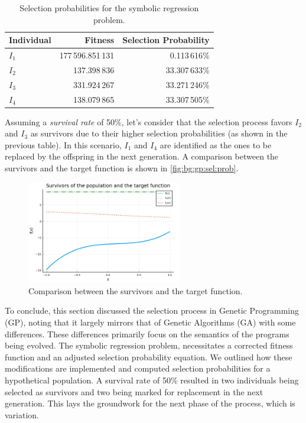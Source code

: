   \begin{table}[ht!]
    \centering
    \begin{tabular}{|l|r|r|}
      \hline
      Individual  & Fitness & Selection Probability \\
      \hline
      \(I_1\) & 177\,596.851\,131 &  0.113\,616\% \\
      \(I_2\) &      137.398\,836 & 33.307\,633\% \\
      \(I_3\) &      331.924\,267 & 33.271\,246\% \\
      \(I_4\) &      138.079\,865 & 33.307\,505\% \\
      \hline
    \end{tabular}
    \caption{Selection probabilities for the symbolic regression problem.}
    \label{tab:bg:gp:sel:prob}
  \end{table}

  Assuming a \emph{survival rate} of 50\%, let's consider that the selection
  process favors \(I_2\) and \(I_3\) as survivors due to their higher selection
  probabilities (as shown in the previous table).
  In this scenario, \(I_1\) and \(I_4\) are identified as the ones to be replaced
  by the offspring in the next generation.
  A comparison between the survivors and the target function is shown in
  \vref{fig:bg:gp:sel:prob}.

  \begin{figure}[ht!]
    \centering
    \includegraphics[width=0.6\textwidth]{img/theoretical_framework/gp_pop_sel_survivors.png}
    \caption{Comparison between the survivors and the target function.}
    \label{fig:bg:gp:sel:prob}
  \end{figure}

  To conclude, this section discussed the selection process in Genetic 
  Programming (GP), noting that it largely mirrors that of Genetic Algorithms 
  (GA) with some differences.
  These differences primarily focus on the semantics of the programs being
  evolved.
  The symbolic regression problem, necessitates a corrected fitness function and
  an adjusted selection probability equation.
  We outlined how these modifications are implemented and computed selection
  probabilities for a hypothetical population.
  A survival rate of 50\% resulted in two individuals being selected as
  survivors and two being marked for replacement in the next generation.
  This lays the groundwork for the next phase of the process, which is
  variation.
